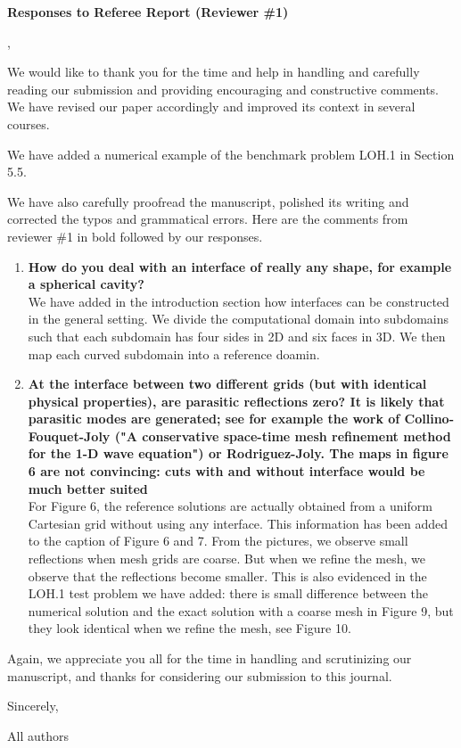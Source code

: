 \documentclass[twoside,11pt]{article}
\begin{document}
\begin{center}
{\Large \textbf{Responses to Referee Report (Reviewer \#1)}}
\end{center}

,

We would like to thank you for the time and help in handling and carefully reading our submission and providing encouraging and constructive comments.  We have revised our paper accordingly and improved its context in several courses. 

We have added a numerical example of the benchmark problem LOH.1 in Section 5.5.

We have also carefully proofread the manuscript, polished its writing and corrected the typos and grammatical errors.  Here are the comments from reviewer \#1 in bold followed by our responses.

\begin{enumerate}
\item \textbf{How do you deal with an interface of really any shape, for example a spherical cavity?}\\
 We have added in the introduction section how interfaces can be constructed in the general setting. We divide the computational domain into subdomains such that each subdomain has four sides in 2D and six faces in 3D. We then map each curved subdomain into a reference doamin.

\item  \textbf{At the interface between two different grids (but with identical physical properties), are parasitic reflections zero? It is likely that parasitic modes are generated; see for example the work of Collino-Fouquet-Joly ("A conservative space-time mesh refinement method for the 1-D wave equation") or Rodriguez-Joly. The maps in figure 6 are not convincing: cuts with and without interface would be much better suited}\\
 For Figure 6, the reference solutions are actually obtained from a uniform Cartesian grid without using any interface. This information has been added to the caption of Figure 6 and 7. From the pictures, we observe small reflections when mesh grids are coarse. But when we refine the mesh, we observe that the reflections become smaller. This is also evidenced in the LOH.1 test problem we have added: there is small difference between the numerical solution and the exact solution with a coarse mesh in Figure 9, but they look identical when we refine the mesh, see Figure 10.%

\end{enumerate}

Again, we appreciate you all for the time in handling and scrutinizing our manuscript, and thanks for considering our submission to this journal.

Sincerely, 

All authors
\end{document}
